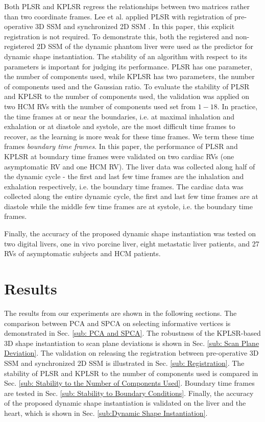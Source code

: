 \documentclass[review]{elsarticle}
\begin{document}
Both PLSR and KPLSR regress the relationships between two matrices rather than two coordinate frames. Lee et al. applied PLSR with registration of pre-operative 3D SSM and synchronized 2D SSM \citep{lee2010dynamic}. In this paper, this explicit registration is not required. To demonstrate this, both the registered and non-registered 2D SSM of the dynamic phantom liver were used as the predictor for dynamic shape instantiation. The stability of an algorithm with respect to its parameters is important for judging its performance. PLSR has one parameter, the number of components used, while KPLSR has two parameters, the number of components used and the Gaussian ratio. To evaluate the stability of PLSR and KPLSR to the number of components used, the validation was applied on two HCM RVs with the number of components used set from $1-18$. In practice, the time frames at or near the boundaries, i.e. at maximal inhalation and exhalation or at diastole and systole, are the most difficult time frames to recover, as the learning is more weak for these time frames. We term these time frames \textit{boundary time frames}. In this paper, the performance of PLSR and KPLSR at boundary time frames were validated on two cardiac RVs (one asymptomatic RV and one HCM RV). The liver data was collected along half of the dynamic cycle - the first and last few time frames are the inhalation and exhalation respectively, i.e. the boundary time frames. The cardiac data was collected along the entire dynamic cycle, the first and last few time frames are at diastole while the middle few time frames are at systole, i.e. the boundary time frames. 

Finally, the accuracy of the proposed dynamic shape instantiation was tested on two digital livers, one in vivo porcine liver, eight metastatic liver patients, and 27 RVs of asymptomatic subjects and HCM patients.

\section{Results}
The results from our experiments are shown in the following sections. The comparison between PCA and SPCA on selecting informative vertices is demonstrated in Sec. \ref{sub: PCA and SPCA}. The robustness of the KPLSR-based 3D shape instantiation to scan plane deviations is shown in Sec. \ref{sub: Scan Plane Deviation}. The validation on releasing the registration between pre-operative 3D SSM and synchronized 2D SSM is illustrated in Sec. \ref{sub: Registration}. The stability of PLSR and KPLSR to the number of components used is compared in Sec. \ref{sub: Stability to the Number of Components Used}. Boundary time frames are tested in Sec. \ref{sub: Stability to Boundary Conditions}. Finally, the accuracy of the proposed dynamic shape instantiation is validated on the liver and the heart, which is shown in Sec. \ref{sub:Dynamic Shape Instantiation}.
\end{document}

